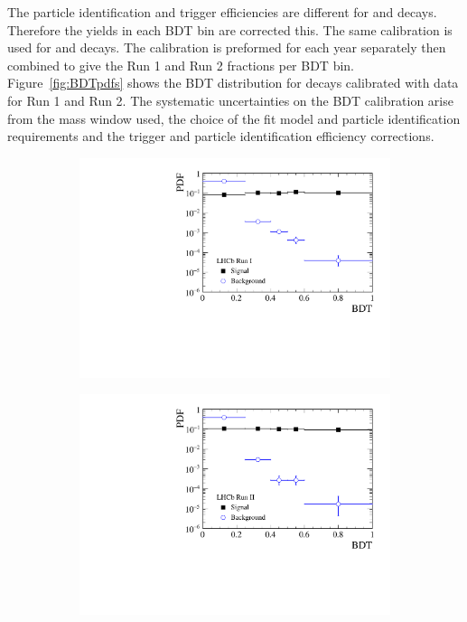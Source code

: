The particle identification and trigger efficiencies are different for \bdkpi and \bmumu decays. Therefore the \bdkpi yields in each BDT bin are corrected this. %
The same calibration is used for \bsmumu and \bdmumu decays.
The calibration is preformed for each year separately then combined to give the Run 1 and Run 2 fractions per BDT bin. Figure~\ref{fig:BDTpdfs} shows the BDT distribution for \bmumu decays calibrated with \bdkpi data for Run 1 and Run 2. 
The systematic uncertainties on the BDT calibration arise from the mass window used, the choice of the fit model and particle identification requirements and the trigger and particle identification efficiency corrections.
\begin{figure}[htbp]
    \centering
   \begin{subfigure}[b]{0.48\textwidth}
        \includegraphics[width= \textwidth]{./Figs/BFAnalysis/C_macros/BDT_calibration_Run1.pdf}
    \end{subfigure}
    \begin{subfigure}[b]{0.48\textwidth}
       \includegraphics[width=\textwidth]{./Figs/BFAnalysis/C_macros/BDT_calibration_Run2.pdf}

\end{subfigure}
\end{figure}
